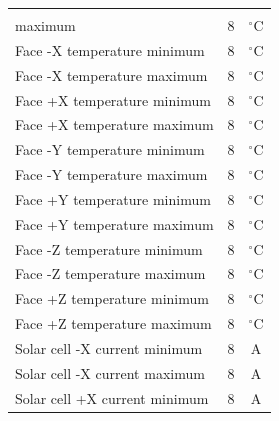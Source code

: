 \begin{apendicesenv}
\begin{table}[h]
\begin{longtable}{@{}lcc@{}}
\begin{tabular}[l]{@{}l@{}}Motherboard temperature\\   maximum\end{tabular}     & 8    & $^{\circ}$C                \\
Face -X temperature minimum                                                     & 8    & $^{\circ}$C                \\
Face -X temperature maximum                                                     & 8    & $^{\circ}$C                \\
Face +X temperature minimum                                                     & 8    & $^{\circ}$C                \\
Face +X temperature maximum                                                     & 8    & $^{\circ}$C                \\
Face -Y temperature minimum                                                     & 8    & $^{\circ}$C                \\
Face -Y temperature maximum                                                     & 8    & $^{\circ}$C                \\
Face +Y temperature minimum                                                     & 8    & $^{\circ}$C                \\
Face +Y temperature maximum                                                     & 8    & $^{\circ}$C                \\
Face -Z temperature minimum                                                     & 8    & $^{\circ}$C                \\
Face -Z temperature maximum                                                     & 8    & $^{\circ}$C                \\
Face +Z temperature minimum                                                     & 8    & $^{\circ}$C                \\
Face +Z temperature maximum                                                     & 8    & $^{\circ}$C                \\
Solar cell -X current minimum                                                   & 8    & A                          \\
Solar cell -X current maximum                                                   & 8    & A                          \\
Solar cell +X current minimum                                                   & 8    & A                          \\

\end{longtable}
\end{table}
\end{apendicesenv}
